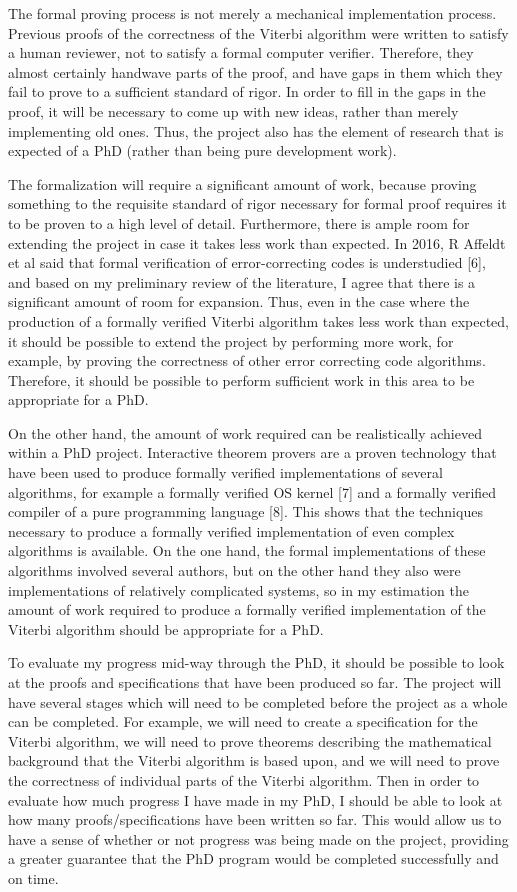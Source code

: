 \documentclass{article}
\begin{document}
The formal proving process is not merely a mechanical implementation process. Previous proofs of the correctness of the Viterbi algorithm were written to satisfy a human reviewer, not to satisfy a formal computer verifier. Therefore, they almost certainly handwave parts of the proof, and have gaps in them which they fail to prove to a sufficient standard of rigor. In order to fill in the gaps in the proof, it will be necessary to come up with new ideas, rather than merely implementing old ones. Thus, the project also has the element of research that is expected of a PhD (rather than being pure development work).

The formalization will require a significant amount of work, because proving something to the requisite standard of rigor necessary for formal proof requires it to be proven to a high level of detail. Furthermore, there is ample room for extending the project in case it takes less work than expected. In 2016, R Affeldt et al said that formal verification of error-correcting codes is understudied [6], and based on my preliminary review of the literature, I agree that there is a significant amount of room for expansion. Thus, even in the case where the production of a formally verified Viterbi algorithm takes less work than expected, it should be possible to extend the project by performing more work, for example, by proving the correctness of other error correcting code algorithms. Therefore, it should be possible to perform sufficient work in this area to be appropriate for a PhD.

On the other hand, the amount of work required can be realistically achieved within a PhD project. Interactive theorem provers are a proven technology that have been used to produce formally verified implementations of several algorithms, for example a formally verified OS kernel [7] and a formally verified compiler of a pure programming language [8]. This shows that the techniques necessary to produce a formally verified implementation of even complex algorithms is available. On the one hand, the formal implementations of these algorithms involved several authors, but on the other hand they also were implementations of relatively complicated systems, so in my estimation the amount of work required to produce a formally verified implementation of the Viterbi algorithm should be appropriate for a PhD.

To evaluate my progress mid-way through the PhD, it should be possible to look at the proofs and specifications that have been produced so far. The project will have several stages which will need to be completed before the project as a whole can be completed. For example, we will need to create a specification for the Viterbi algorithm, we will need to prove theorems describing the mathematical background that the Viterbi algorithm is based upon, and we will need to prove the correctness of individual parts of the Viterbi algorithm. Then in order to evaluate how much progress I have made in my PhD, I should be able to look at how many proofs/specifications have been written so far. This would allow us to have a sense of whether or not progress was being made on the project, providing a greater guarantee that the PhD program would be completed successfully and on time.
\end{document}

